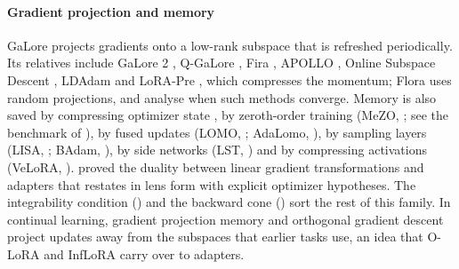 \paragraph{Gradient projection and memory}
GaLore \citep{zhao2024galore} projects gradients onto a low-rank subspace that is refreshed periodically. Its relatives include GaLore 2 \citep{su2025galore}, Q-GaLore \citep{zhang2024q}, Fira \citep{chen2024fira}, APOLLO \citep{zhu2024apollo}, Online Subspace Descent \citep{liang2024memory}, LDAdam \citep{xrobert2025ldadam} and LoRA-Pre \citep{wang2026taming}, which compresses the momentum; Flora \citep{hao2024flora} uses random projections, and \citet{he2024subspace} analyse when such methods converge. Memory is also saved by compressing optimizer state \citep{shazeer2018adafactor,dettmers20218,zhang2024adam}, by zeroth-order training (MeZO, \citealp{malladi2023fine}; see the benchmark of \citealp{zhang2024revisiting}), by fused updates (LOMO, \citealp{lv2023full}; AdaLomo, \citealp{lv2023adalomo}), by sampling layers (LISA, \citealp{pan2024lisa}; BAdam, \citealp{luo2024badam}), by side networks (LST, \citealp{sung2022lst}) and by compressing activations (VeLoRA, \citealp{miles2024velora}). \citet{xtorrobahennigen2025duality} proved the duality between linear gradient transformations and adapters that  restates in lens form with explicit optimizer hypotheses. The integrability condition () and the backward cone () sort the rest of this family. In continual learning, gradient projection memory \citep{saha2021gradient} and orthogonal gradient descent \citep{farajtabar2019orthogonal} project updates away from the subspaces that earlier tasks use, an idea that O-LoRA \citep{wang2023orthogonal} and InfLoRA \citep{liang2024inflora} carry over to adapters.

